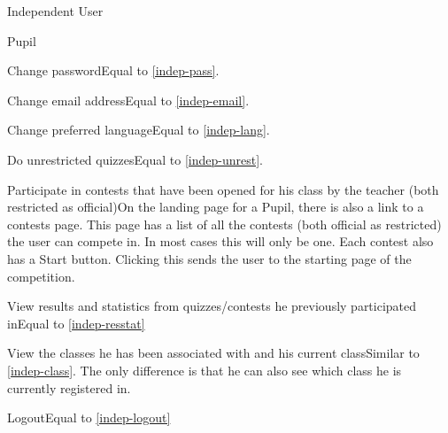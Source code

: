 \begin{section}{Independent User}
    \end{section}
    

\begin{section}{Pupil}

    \begin{subsection}{Change password}Equal to \ref{indep-pass}.\end{subsection}
    \begin{subsection}{Change email address}Equal to \ref{indep-email}.\end{subsection}
    \begin{subsection}{Change preferred language}Equal to \ref{indep-lang}.\end{subsection}
    \begin{subsection}{Do unrestricted quizzes}Equal to \ref{indep-unrest}.\end{subsection}
    \begin{subsection}{Participate in contests that have been opened for his class by the teacher (both restricted as official)}On the landing page for a Pupil, there is also a link to a contests page. This page has a list of all the contests (both official as restricted) the user can compete in. In most cases this will only be one. Each contest also has a Start button. Clicking this sends the user to the starting page of the competition.\end{subsection}
    \begin{subsection}{View results and statistics from quizzes/contests he previously participated in}Equal to \ref{indep-resstat}\end{subsection}
    \begin{subsection}{View the classes he has been associated with and his current class}Similar to \ref{indep-class}. The only difference is that he can also see which class he is currently registered in.\end{subsection}
	\begin{subsection}{Logout}Equal to \ref{indep-logout}\end{subsection}

\end{section}

